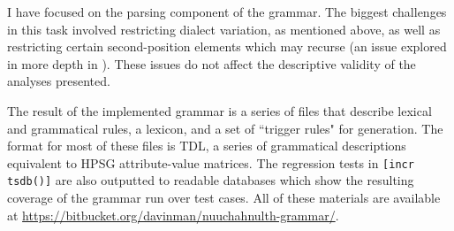 I have focused on the parsing component of the grammar. The biggest challenges in this task involved restricting dialect variation, as mentioned above, as well as restricting certain second-position elements which may recurse (an issue explored in more depth in \citealt{bender2010reweaving}). These issues do not affect the descriptive validity of the analyses presented.


The result of the implemented grammar is a series of files that describe lexical and grammatical rules, a lexicon, and a set of ``trigger rules" for generation. The format for most of these files is TDL, a series of grammatical descriptions equivalent to HPSG attribute-value matrices. The regression tests in \texttt{[incr tsdb()]} are also outputted to readable databases which show the resulting coverage of the grammar run over test cases. All of these materials are available at \url{https://bitbucket.org/davinman/nuuchahnulth-grammar/}.

